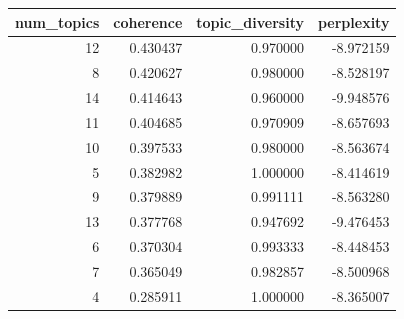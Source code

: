 \begin{tabular}{rrrr}
\toprule
num_topics & coherence & topic_diversity & perplexity \\
\midrule
12 & 0.430437 & 0.970000 & -8.972159 \\
8 & 0.420627 & 0.980000 & -8.528197 \\
14 & 0.414643 & 0.960000 & -9.948576 \\
11 & 0.404685 & 0.970909 & -8.657693 \\
10 & 0.397533 & 0.980000 & -8.563674 \\
5 & 0.382982 & 1.000000 & -8.414619 \\
9 & 0.379889 & 0.991111 & -8.563280 \\
13 & 0.377768 & 0.947692 & -9.476453 \\
6 & 0.370304 & 0.993333 & -8.448453 \\
7 & 0.365049 & 0.982857 & -8.500968 \\
4 & 0.285911 & 1.000000 & -8.365007 \\
\bottomrule
\end{tabular}
